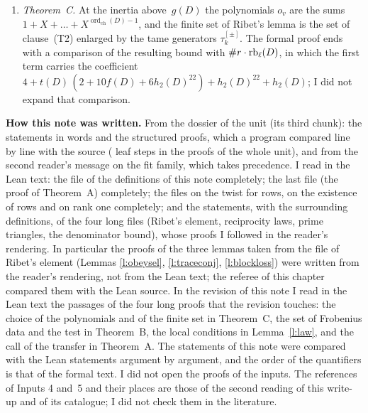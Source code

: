 \documentclass[11pt,a4paper]{article}
\newcommand{\m}[1]{\mbox{$#1$}}        %
\newcommand{\subhead}[1]{\par\addvspace{9pt plus 2pt}\Needspace{4\baselineskip}\noindent\textbf{#1}\enspace\ignorespaces}
\theoremstyle{plainx}
\theoremstyle{uprightx}
\newcommand{\Dm}[1]{m(#1)}
\newcommand{\tD}[1]{t(#1)}
\newcommand{\fD}[1]{f(#1)}
\newcommand{\gD}[1]{g(#1)}
\newcommand{\hhD}[1]{h_2(#1)}
\newcommand{\ordch}[1]{\operatorname{ord}_{\mathrm{ch}}(#1)}
\begin{document}
\begin{enumerate}[label=\textup{\arabic*.},leftmargin=1.6em,itemsep=5pt]
good eigensystems from the space \m{W_{\Dm{D}}(D)} and uses them for eigensystems found on \m{W_j(D)}; it passes
from one to the other by two results of the unit on good forms (Input~6), in the contrapositive form of
part~(b). They are imports of this unit and do not appear in the concordance, which lists the declarations of
the unit only.
\item \emph{Theorem~C.} At the inertia above~\m{\gD{D}} the polynomials $o_v$ are the sums
\m{1+X+\dots+X^{\ordch{D}-1}}, and the finite set of Ribet's lemma is the set of clause~(T2) enlarged by the tame
generators \m{\tau_k^{[\pm]}}. The formal proof ends with a comparison of the resulting bound with
\m{\#r\cdot\rowBudget{D}{\ell}}, in which the first term carries the coefficient
\m{4+\tD{D}\,(2+10\fD{D}+6\hhD{D}^{22})+\hhD{D}^{22}+\hhD{D}}; I did not expand that comparison.
\end{enumerate}

\subhead{How this note was written.} From the dossier of the unit (its third chunk): the statements in words and
the structured proofs, which a program compared line by line with the source (\UnitSteps{} leaf steps in the
\UnitProofs{} proofs of the whole unit), and from the second reader's message on the fit family, which takes
precedence. I read in the Lean text: the file of the definitions of this note completely; the last file (the
proof of Theorem~A) completely; the files on the twist for rows, on the existence of rows and on rank one
completely; and the statements, with the surrounding definitions, of the four long files (Ribet's element,
reciprocity laws, prime triangles, the denominator bound), whose proofs I followed in the reader's rendering.
In particular the proofs of the three lemmas taken from the file of Ribet's element (Lemmas \ref{l:obeysel},
\ref{l:traceconj}, \ref{l:blockloss}) were written from the reader's rendering, not from the Lean text; the
referee of this chapter compared them with the Lean source. In the revision of this note I read in the Lean text
the passages of the four long proofs that the revision touches: the choice of the polynomials and of the finite
set in Theorem~C, the set of Frobenius data and the test in Theorem~B, the local conditions in
Lemma~\ref{l:law}, and the call of the transfer in Theorem~A.
The statements of this note were compared with the Lean statements argument by argument, and the order of the
quantifiers is that of the formal text. I did not open the proofs of the inputs. The references of Inputs 4
and~5 and their places are those of the second reading of this write-up and of its catalogue; I did not check
them in the literature.
\end{document}
